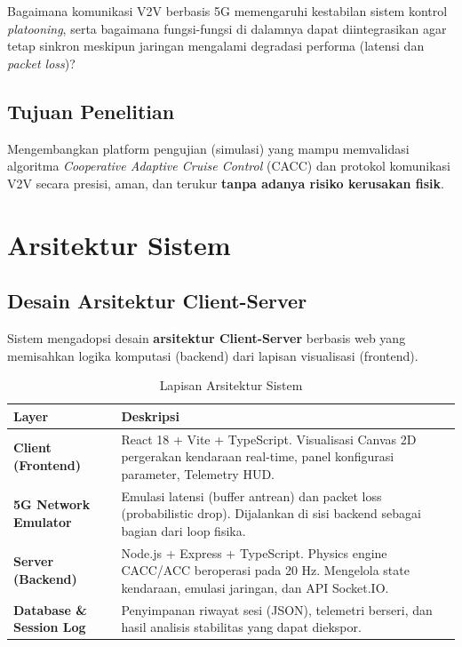 \documentclass[12pt,a4paper]{article}
\begin{document}
Bagaimana komunikasi V2V berbasis 5G memengaruhi kestabilan sistem kontrol
\textit{platooning}, serta bagaimana fungsi-fungsi di dalamnya dapat diintegrasikan agar
tetap sinkron meskipun jaringan mengalami degradasi performa (latensi dan
\textit{packet loss})?

\subsection{Tujuan Penelitian}

Mengembangkan platform pengujian (simulasi) yang mampu memvalidasi algoritma
\textit{Cooperative Adaptive Cruise Control} (CACC) dan protokol komunikasi V2V secara
presisi, aman, dan terukur \textbf{tanpa adanya risiko kerusakan fisik}.

\section{Arsitektur Sistem}

\subsection{Desain Arsitektur Client-Server}

Sistem mengadopsi desain \textbf{arsitektur Client-Server} berbasis web yang memisahkan
logika komputasi (backend) dari lapisan visualisasi (frontend).

\begin{table}[ht]
\centering
\caption{Lapisan Arsitektur Sistem}
\begin{tabularx}{\linewidth}{lX}
\toprule
\textbf{Layer} & \textbf{Deskripsi} \\
\midrule
\textbf{Client (Frontend)} &
  React 18 + Vite + TypeScript. Visualisasi Canvas 2D pergerakan kendaraan
  real-time, panel konfigurasi parameter, Telemetry HUD. \\[0.5em]
\textbf{5G Network Emulator} &
  Emulasi latensi (buffer antrean) dan packet loss (probabilistic drop).
  Dijalankan di sisi backend sebagai bagian dari loop fisika. \\[0.5em]
\textbf{Server (Backend)} &
  Node.js + Express + TypeScript. Physics engine CACC/ACC beroperasi pada
  20 Hz. Mengelola state kendaraan, emulasi jaringan, dan API Socket.IO. \\[0.5em]
\textbf{Database \& Session Log} &
  Penyimpanan riwayat sesi (JSON), telemetri berseri, dan hasil analisis
  stabilitas yang dapat diekspor. \\
\bottomrule
\end{tabularx}
\end{table}
\end{document}

